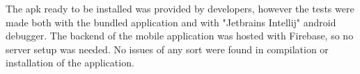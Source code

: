 \documentclass[../main.tex]{subfiles}
\begin{document}
    The apk ready to be installed was provided by developers, however the tests were made both with the bundled application
    and with "Jetbrains Intellij" android debugger. The backend of the mobile application was hosted with
    Firebase, so no server setup was needed. No issues of any sort were found in compilation or installation of the application.
\end{document}
